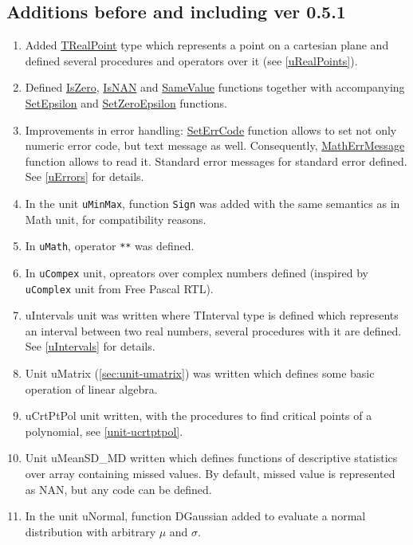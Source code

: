 \documentclass[12pt,a4paper,oneside]{report}
\newcommand{\code}[1]{\texttt{#1}}
\begin{document}
\subsection*{Additions before and including ver 0.5.1}
\begin{enumerate}
	\item Added \hyperref[types:trealpoint]{TRealPoint} type which represents a point on a cartesian plane and defined several procedures and operators over it (see \ref{uRealPoints}).
	\item Defined \hyperref[utypes-IsZero]{IsZero}, \hyperref[utypes-IsNan]{IsNAN} and \hyperref[utypes-SameValue]{SameValue} functions together with accompanying \hyperref[utypes-SetEpsilon]{SetEpsilon} and \hyperref[utypes-SetZeroEpsilon]{SetZeroEpsilon} functions.
	\item Improvements in error handling: \hyperref[uErrors-SetErrCode]{SetErrCode} function allows to set not only numeric error code, but text message as well. Consequently, \hyperref[uErrors-MathErrMessage]{MathErrMessage} function allows to read it.  Standard error messages for standard error defined. See \ref{uErrors} for details.
	\item In the unit \code{uMinMax}, function \code{Sign} was added with the same semantics as in Math unit, for compatibility reasons.
	\item In \code{uMath}, operator \code{**} was defined.
	\item In \code{uCompex} unit, opreators over complex numbers defined (inspired by \\ \code{uComplex} unit from Free Pascal RTL).
	\item uIntervals unit was written where TInterval type is defined which represents an interval between two real numbers, several procedures with it are defined. See \ref{uIntervals} for details.
	\item Unit uMatrix (\ref{sec:unit-umatrix}) was written which defines some basic operation of linear algebra.
	\item uCrtPtPol unit written, with the procedures to find critical points of a polynomial, see \ref{unit-ucrtptpol}.
	\item Unit uMeanSD{\_}MD written which defines functions of descriptive statistics over array containing missed values. By default, missed value is represented as NAN, but any code can be defined.
	\item In the unit uNormal, function DGaussian added to evaluate a normal distribution with arbitrary $\mu$ and $\sigma$.

\end{enumerate}
\end{document}
